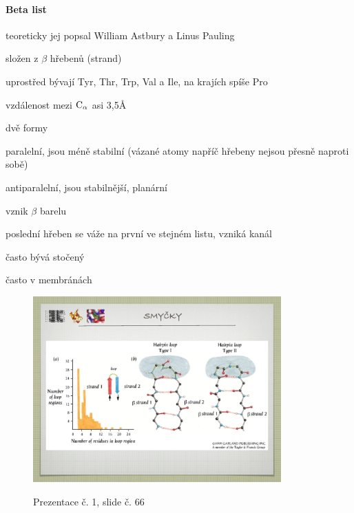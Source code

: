\documentclass[DIV=8]{scrreprt}
\begin{document}
\paragraph{Beta list}
\begin{myItemize}[nosep]
    \item teoreticky jej popsal William Astbury a Linus Pauling
    \item složen z \(\beta\) hřebenů (strand)
    \item uprostřed bývají Tyr, Thr, Trp, Val a Ile, na krajích spíše Pro
    \item vzdálenost mezi \(\ce{C_\alpha}\) asi 3,5Å
    \item dvě formy
\begin{myItemize}[nosep]
    \item paralelní, jsou méně stabilní (vázané atomy napříč hřebeny nejsou přesně naproti sobě)
    \item antiparalelní, jsou stabilnější, planární
\end{myItemize}

    \item vznik \(\beta\) barelu
\begin{myItemize}[nosep]
    \item poslední hřeben se váže na první ve stejném listu, vzniká kanál
    \item často bývá stočený
    \item často v membránách
\end{myItemize}

\end{myItemize}



\begin{figure}
    \caption{Prezentace č. 1, slide č. 66}
    \includegraphics[width=0.85\textwidth]{slides-1/slide-66.jpg}
    \centering
    \label{slides-1-slide-66}
\end{figure}
\end{document}
